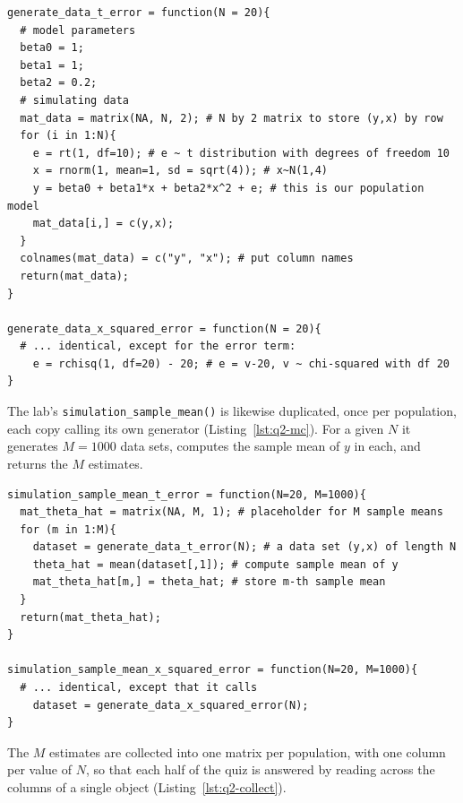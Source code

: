 \documentclass[11pt]{article}
\newcommand{\code}[1]{\texttt{#1}}
\begin{document}
\begin{lstlisting}[style=Rcode,caption={The two data generating processes. Only
the line drawing \code{e} differs (excerpt from
\code{R/q2\_monte\_carlo.R}).},label={lst:q2-dgp}]
generate_data_t_error = function(N = 20){
  # model parameters
  beta0 = 1;
  beta1 = 1;
  beta2 = 0.2;
  # simulating data
  mat_data = matrix(NA, N, 2); # N by 2 matrix to store (y,x) by row
  for (i in 1:N){
    e = rt(1, df=10); # e ~ t distribution with degrees of freedom 10
    x = rnorm(1, mean=1, sd = sqrt(4)); # x~N(1,4)
    y = beta0 + beta1*x + beta2*x^2 + e; # this is our population model
    mat_data[i,] = c(y,x);
  }
  colnames(mat_data) = c("y", "x"); # put column names
  return(mat_data);
}

generate_data_x_squared_error = function(N = 20){
  # ... identical, except for the error term:
    e = rchisq(1, df=20) - 20; # e = v-20, v ~ chi-squared with df 20
}
\end{lstlisting}

The lab's \code{simulation\_sample\_mean()} is likewise duplicated, once per
population, each copy calling its own generator
(Listing~\ref{lst:q2-mc}). For a given $N$ it generates $M = 1000$ data sets,
computes the sample mean of $y$ in each, and returns the $M$ estimates.

\begin{lstlisting}[style=Rcode,caption={The Monte Carlo loop, duplicated once
per population (excerpt from \code{R/q2\_monte\_carlo.R}).},label={lst:q2-mc}]
simulation_sample_mean_t_error = function(N=20, M=1000){
  mat_theta_hat = matrix(NA, M, 1); # placeholder for M sample means
  for (m in 1:M){
    dataset = generate_data_t_error(N); # a data set (y,x) of length N
    theta_hat = mean(dataset[,1]); # compute sample mean of y
    mat_theta_hat[m,] = theta_hat; # store m-th sample mean
  }
  return(mat_theta_hat);
}

simulation_sample_mean_x_squared_error = function(N=20, M=1000){
  # ... identical, except that it calls
    dataset = generate_data_x_squared_error(N);
}
\end{lstlisting}

The $M$ estimates are collected into one matrix per population, with one column
per value of $N$, so that each half of the quiz is answered by reading across
the columns of a single object (Listing~\ref{lst:q2-collect}).
\end{document}
